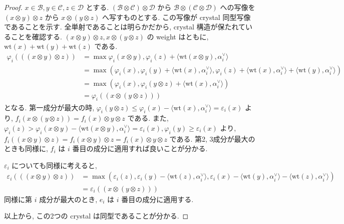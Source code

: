\documentclass[
  a4paper, 
  12pt,
  ja=standard,
  xelatex,
  left=30truemm,
  right=30truemm,
  titlepage 
]{bxjsarticle}
\theoremstyle{definition}
\begin{document}
\begin{proof}
  $x \in \mathcal{B}, y \in \mathcal{C}, z \in \mathcal{D}$ とする. 
  $(\mathcal{B} \otimes \mathcal{C}) \otimes \mathcal{D}$ から $\mathcal{B} \otimes (\mathcal{C} \otimes \mathcal{D})$ への写像を
  $( x \otimes y) \otimes z$ から $ x \otimes ( y \otimes z)$ へ写すものとする. 
  この写像が crystal 同型写像であることを示す.
  全単射であることは明らかだから, crystal 構造が保たれていることを確認する. 
  $(x \otimes y ) \otimes z, x \otimes ( y  \otimes z )$ の weight はともに, $\mathrm{wt}(x) + \mathrm{wt}(y) + \mathrm{wt}(z)$ である.
  \begin{align*}
    \varphi_i(((x \otimes y ) \otimes z))
    &= \max{\varphi_i(x \otimes y), \varphi_i(z) + \langle \mathrm{wt}(x \otimes y), \alpha_i^{\vee} \rangle} \\
    &= \max{(\varphi_i(x), \varphi_i(y) + \langle \mathrm{wt} (x), \alpha_i^{\vee} \rangle, \varphi_i(z) + \langle \mathrm{wt}(x),
    \alpha_i^{\vee} \rangle + \langle \mathrm{wt}(y), \alpha_i^{\vee} \rangle )} \\
    &= \max{(\varphi_i(x), \varphi_i( y  \otimes z ) + \langle \mathrm{wt}(x), \alpha_i^{\vee}\rangle )} \\
    &= \varphi_i((x \otimes ( y  \otimes z )))
  \end{align*}
  となる. 
  第一成分が最大の時,
  $\varphi_i(y \otimes z) \leq
  \varphi_i(x) - \langle \mathrm{wt}(x), \alpha_i^{\vee}\rangle =
  \varepsilon_i(x)$
  より, $f_i(x \otimes (y \otimes z)) = f_i(x) \otimes y \otimes z$
  である.
  また, 
  $\varphi_i(z) > \varphi_i(x \otimes y) - \langle \mathrm{wt}(x \otimes y), \alpha_i^{\vee} \rangle = \varepsilon_i(x),
  \varphi_i(y) \geq \varepsilon_i(x)
  $
  より, $f_i((x \otimes y) \otimes z) = f_i(x \otimes y) \otimes z = f_i(x) \otimes y \otimes z$ である.
  第2, 3成分が最大のときも同様に, $f_i$ は $i$ 番目の成分に適用すれば良いことが分かる.

  $\varepsilon_i$ についても同様に考えると,
  \begin{align*}
    \varepsilon_i(((x \otimes y ) \otimes z))
    &= \max{(\varepsilon_i(z), \varepsilon_i(y) - \langle \mathrm{wt}(z), \alpha_i^{\vee} \rangle,
    \varepsilon_i(x) - \langle \mathrm{wt}(y), \alpha_i^{\vee} \rangle - \langle \mathrm{wt}(z), \alpha_i^{\vee} \rangle)} \\
    &= \varepsilon_i((x \otimes ( y  \otimes z )))
  \end{align*}
  同様に第 $i$ 成分が最大のとき, $e_i$ は $i$ 番目の成分に適用する.

  以上から, この2つの crystal は同型であることが分かる.
\end{proof}
\end{document}

